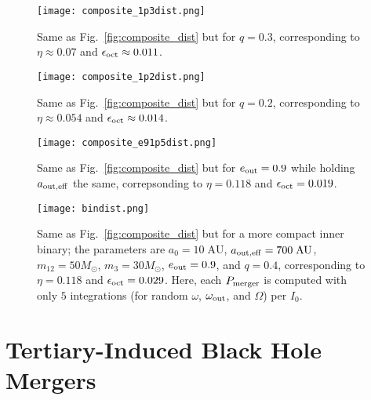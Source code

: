 \documentclass[
        fleqn,
        usenatbib,
    ]{mnras}
\newlength{\colummwidth}
\begin{document}
\begin{figure}
    \centering
    \texttt{[image: composite\_1p3dist.png]}
    \caption{Same as Fig.~\ref{fig:composite_dist} but for $q = 0.3$,
    corresponding to $\eta
    \approx 0.07$ and $\epsilon_{\rm oct} \approx 0.011$.}\label{fig:composite_1p3}
\end{figure}
\begin{figure}
    \centering
    \texttt{[image: composite\_1p2dist.png]}
    \caption{Same as Fig.~\ref{fig:composite_dist} but for $q = 0.2$,
    corresponding to $\eta
    \approx 0.054$ and $\epsilon_{\rm oct} \approx 0.014$.
    }\label{fig:composite_1p2}
\end{figure}
\begin{figure}
    \centering
    \texttt{[image: composite\_e91p5dist.png]}
    \caption{Same as Fig.~\ref{fig:composite_dist} but for $e_{\rm out} = 0.9$
    while holding $a_{\rm out, eff}$ the same, correpsonding to $\eta =
    0.118$ and $\epsilon_{\rm oct} = 0.019$. }\label{fig:composite_e91p5}
\end{figure}
\begin{figure}
    \centering
    \texttt{[image: bindist.png]}
    \caption{Same as Fig.~\ref{fig:composite_dist} but for a more compact inner
    binary; the parameters are $a_0 = 10\;\mathrm{AU}$, $a_{\rm out, eff} =
    700\;\mathrm{AU}$, $m_{12} = 50M_{\odot}$, $m_3 = 30M_{\odot}$, $e_{\rm
    out} = 0.9$, and $q = 0.4$, corresponding to $\eta = 0.118$ and
    $\epsilon_{\rm oct} = 0.029$. Here, each $P_{\rm merger}$ is computed with
    only $5$ integrations (for random $\omega$, $\omega_{\rm out}$, and
    $\Omega$) per $I_0$.}\label{fig:composite_bindist}
\end{figure}

\section{Tertiary-Induced Black Hole Mergers}\label{s:with_gw}
\end{document}
